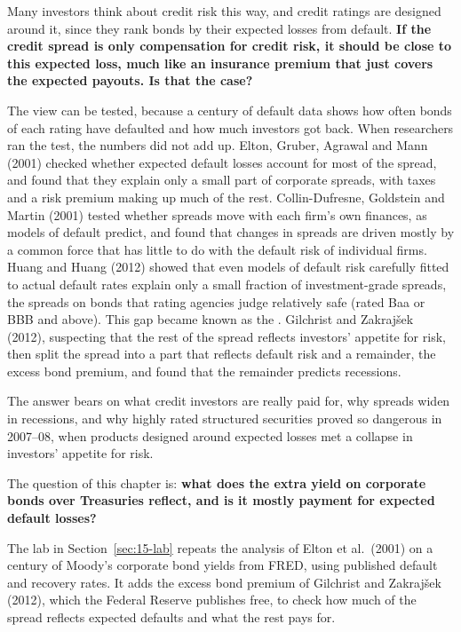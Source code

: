 Many investors think about credit risk this way, and credit ratings are designed around it, since they rank bonds by their expected losses from default.
\textbf{If the credit spread is only compensation for credit risk, it should be close to this expected loss, much like an insurance premium that just covers the expected payouts. Is that the case?}


The view can be tested, because a century of default data shows how often bonds of each rating have defaulted and how much investors got back. When researchers ran the test, the numbers did not add up. Elton, Gruber, Agrawal and Mann (2001) checked whether expected default losses account for most of the spread, and found that they explain only a small part of corporate spreads, with taxes and a risk premium making up much of the rest. Collin-Dufresne, Goldstein and Martin (2001) tested whether spreads move with each firm's own finances, as models of default predict, and found that changes in spreads are driven mostly by a common force that has little to do with the default risk of individual firms. Huang and Huang (2012) showed that even models of default risk carefully fitted to actual default rates explain only a small fraction of investment-grade spreads, the spreads on bonds that rating agencies judge relatively safe (rated Baa or BBB and above). This gap became known as the . Gilchrist and Zakraj\v{s}ek (2012), suspecting that the rest of the spread reflects investors' appetite for risk, then split the spread into a part that reflects default risk and a remainder, the excess bond premium, and found that the remainder predicts recessions.

The answer bears on what credit investors are really paid for, why spreads widen in recessions, and why highly rated structured securities proved so dangerous in 2007--08, when products designed around expected losses met a collapse in investors' appetite for risk. 

The question of this chapter is: \textbf{what does the extra yield on corporate bonds over Treasuries reflect, and is it mostly payment for expected default losses?}

The lab in Section~\ref{sec:15-lab} repeats the analysis of Elton et al.\ (2001) on a century of Moody's corporate bond yields from FRED, using published default and recovery rates. It adds the excess bond premium of Gilchrist and Zakraj\v{s}ek (2012), which the Federal Reserve publishes free, to check how much of the spread reflects expected defaults and what the rest pays for.


